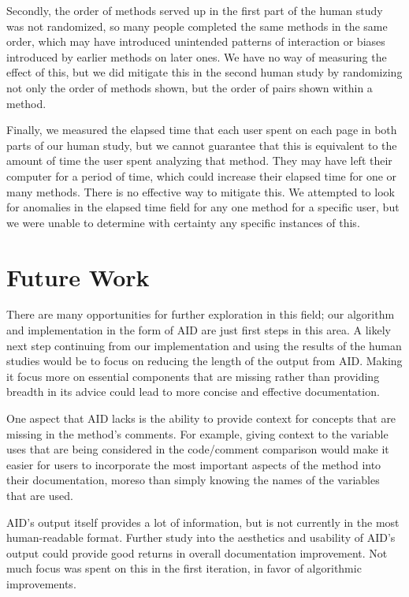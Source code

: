 \documentclass[preprint]{sigplanconf}
\begin{document}
Secondly, the order of methods served up in the first part of the human study was not randomized, so many people completed the same methods in the same order, which may have introduced unintended patterns of interaction or biases introduced by earlier methods on later ones. We have no way of measuring the effect of this, but we did mitigate this in the second human study by randomizing not only the order of methods shown, but the order of pairs shown within a method.

Finally, we measured the elapsed time that each user spent on each page in both parts of our human study, but we cannot guarantee that this is equivalent to the amount of time the user spent analyzing that method. They may have left their computer for a period of time, which could increase their elapsed time for one or many methods. There is no effective way to mitigate this. We attempted to look for anomalies in the elapsed time field for any one method for a specific user, but we were unable to determine with certainty any specific instances of this.

\section{Future Work}
There are many opportunities for further exploration in this field; our algorithm and implementation in the form of AID are just first steps in this area. A likely next step continuing from our implementation and using the results of the human studies would be to focus on reducing the length of the output from AID. Making it focus more on essential components that are missing rather than providing breadth in its advice could lead to more concise and effective documentation.

One aspect that AID lacks is the ability to provide context for concepts that are missing in the method's comments. For example, giving context to the variable uses that are being considered in the code/comment comparison would make it easier for users to incorporate the most important aspects of the method into their documentation, moreso than simply knowing the names of the variables that are used.

AID's output itself provides a lot of information, but is not currently in the most human-readable format. Further study into the aesthetics and usability of AID's output could provide good returns in overall documentation improvement. Not much focus was spent on this in the first iteration, in favor of algorithmic improvements.
\end{document}
